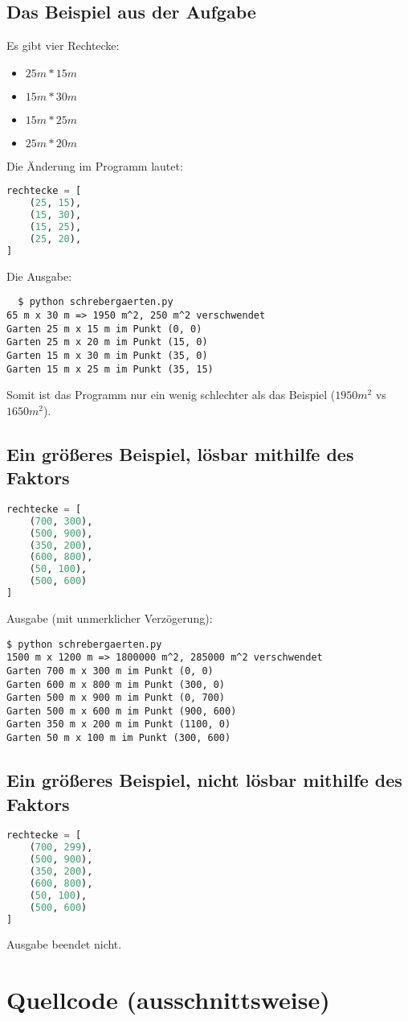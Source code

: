 \documentclass[a4paper,10pt,ngerman]{scrartcl}
\begin{document}
\subsection{Das Beispiel aus der Aufgabe}
Es gibt vier Rechtecke: 
\begin{itemize}
  \item $25m*15m$
  \item $15m*30m$
  \item $15m*25m$
  \item $25m*20m$
\end{itemize}
Die Änderung im Programm lautet:
\begin{lstlisting}[language=Python]
rechtecke = [
    (25, 15),
    (15, 30),
    (15, 25),
    (25, 20),
]
\end{lstlisting}
Die Ausgabe:
\begin{lstlisting}
  $ python schrebergaerten.py
65 m x 30 m => 1950 m^2, 250 m^2 verschwendet
Garten 25 m x 15 m im Punkt (0, 0)
Garten 25 m x 20 m im Punkt (15, 0)
Garten 15 m x 30 m im Punkt (35, 0)
Garten 15 m x 25 m im Punkt (35, 15)
\end{lstlisting}

Somit ist das Programm nur ein wenig schlechter als das Beispiel ($1950m^2$ vs $1650m^2$).


\subsection{Ein größeres Beispiel, lösbar mithilfe des Faktors}

\begin{lstlisting}[language=Python]
rechtecke = [
    (700, 300),
    (500, 900),
    (350, 200),
    (600, 800),
    (50, 100),
    (500, 600)
]
\end{lstlisting}
Ausgabe (mit unmerklicher Verzögerung):
\begin{lstlisting}
$ python schrebergaerten.py
1500 m x 1200 m => 1800000 m^2, 285000 m^2 verschwendet
Garten 700 m x 300 m im Punkt (0, 0)
Garten 600 m x 800 m im Punkt (300, 0)
Garten 500 m x 900 m im Punkt (0, 700)
Garten 500 m x 600 m im Punkt (900, 600)
Garten 350 m x 200 m im Punkt (1100, 0)
Garten 50 m x 100 m im Punkt (300, 600)
\end{lstlisting}

\subsection{Ein größeres Beispiel, nicht lösbar mithilfe des Faktors}
\begin{lstlisting}[language=Python]
rechtecke = [
    (700, 299),
    (500, 900),
    (350, 200),
    (600, 800),
    (50, 100),
    (500, 600)
]
\end{lstlisting}
Ausgabe beendet nicht.

\section{Quellcode (ausschnittsweise)}

\printbibliography 
\end{document}
